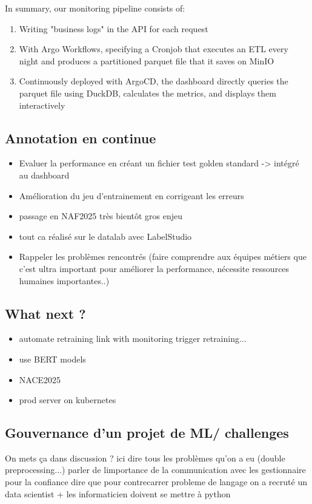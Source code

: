 In summary, our monitoring pipeline consists of:

\begin{enumerate}
    \item Writing "business logs" in the API for each request
    \item With Argo Workflows, specifying a Cronjob that executes an ETL every night and produces a partitioned parquet file that it saves on MinIO
    \item Continuously deployed with ArgoCD, the dashboard directly queries the parquet file using DuckDB, calculates the metrics, and displays them interactively
\end{enumerate}



\subsection{Annotation en continue}

\begin{itemize}
    \item Evaluer la performance en créant un fichier test golden standard -> intégré au dashboard
    \item Amélioration du jeu d'entrainement en corrigeant les erreurs
    \item passage en NAF2025 très bientôt gros enjeu
    \item tout ca réalisé sur le datalab avec LabelStudio
    \item Rappeler les problèmes rencontrés (faire comprendre aux équipes métiers que c'est ultra important pour améliorer la performance, nécessite ressources humaines importantes..)
\end{itemize}

\subsection{What next ?}

\begin{itemize}
    \item automate retraining link with monitoring trigger retraining...
    \item use BERT models
    \item NACE2025
    \item prod server on kubernetes
\end{itemize}

\subsection{Gouvernance d'un projet de ML/ challenges}

On mets ça dans discussion ?
ici dire tous les problèmes qu'on a eu (double preprocessing...)
parler de limportance de la communication avec les gestionnaire pour la confiance
dire que pour contrecarrer probleme de langage on a recruté un data scientist + les informaticien doivent se mettre à python

